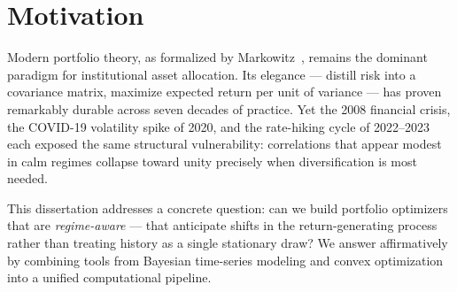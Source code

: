 \section{Motivation}

Modern portfolio theory, as formalized by Markowitz~\cite{markowitz1952}, remains the dominant paradigm for institutional asset allocation. Its elegance --- distill risk into a covariance matrix, maximize expected return per unit of variance --- has proven remarkably durable across seven decades of practice. Yet the 2008 financial crisis, the COVID-19 volatility spike of 2020, and the rate-hiking cycle of 2022--2023 each exposed the same structural vulnerability: correlations that appear modest in calm regimes collapse toward unity precisely when diversification is most needed.

This dissertation addresses a concrete question: can we build portfolio optimizers that are \textit{regime-aware} --- that anticipate shifts in the return-generating process rather than treating history as a single stationary draw? We answer affirmatively by combining tools from Bayesian time-series modeling and convex optimization into a unified computational pipeline.
